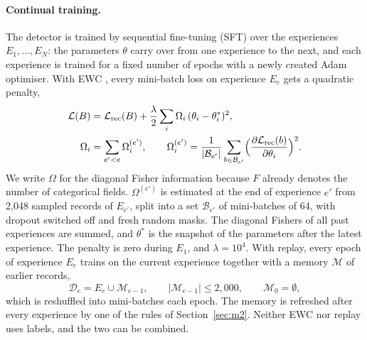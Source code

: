 \documentclass{article} %
\begin{document}
\paragraph{Continual training.}
The detector is trained by sequential fine-tuning (SFT) over the experiences
$E_1,\dots,E_N$: the parameters $\theta$ carry over from one experience to the
next, and each experience is trained for a fixed number of epochs with a newly
created Adam optimiser. With EWC \citep{kirkpatrick2017overcoming}, every
mini-batch loss on experience $E_e$ gets a quadratic penalty,
\begin{equation}
\begin{aligned}
\mathcal{L}(B) &= \mathcal{L}_{\text{rec}}(B) + \frac{\lambda}{2}\sum_i \Omega_i\,(\theta_i - \theta^{*}_i)^2,\\
\Omega_i &= \sum_{e' < e} \Omega^{(e')}_i,\qquad
\Omega^{(e')}_i = \frac{1}{|\mathcal{B}_{e'}|}\sum_{b\in\mathcal{B}_{e'}}
\Bigl(\frac{\partial \mathcal{L}_{\text{rec}}(b)}{\partial \theta_i}\Bigr)^{2}.
\end{aligned}
\label{eq:ewc}
\end{equation}
We write $\Omega$ for the diagonal Fisher information because $F$ already
denotes the number of categorical fields. $\Omega^{(e')}$ is estimated at the
end of experience $e'$ from 2{,}048 sampled records of $E_{e'}$, split into a
set $\mathcal{B}_{e'}$ of mini-batches of 64, with dropout switched off and fresh
random masks. The diagonal Fishers of all past experiences are summed, and
$\theta^{*}$ is the snapshot of the parameters after the latest experience. The
penalty is zero during $E_1$, and $\lambda = 10^{4}$. With replay, every epoch of
experience $E_e$ trains on the current experience together with a memory
$\mathcal{M}$ of earlier records,
\begin{equation}
\mathcal{D}_e = E_e \cup \mathcal{M}_{e-1},\qquad |\mathcal{M}_{e-1}| \le 2{,}000,\qquad \mathcal{M}_0 = \emptyset,
\label{eq:replay}
\end{equation}
which is reshuffled into mini-batches each epoch. The memory is refreshed after
every experience by one of the rules of Section~\ref{sec:m2}. Neither EWC nor
replay uses labels, and the two can be combined.
\end{document}
